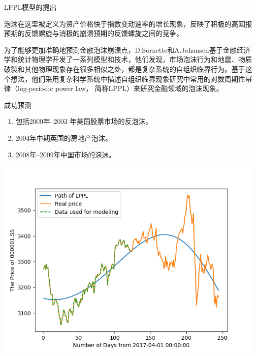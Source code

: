 \begin{frame}[t]{LPPL模型的提出}
    \begin{definition}[LPPL模型对金融泡沫的定义]
        泡沫在这里被定义为资产价格快于指数变动速率的增长现象，反映了积极的高回报预期的反馈螺旋与消极的崩溃预期的反馈螺旋之间的竞争。
    \end{definition}
    \vfill
    为了能够更加准确地预测金融泡沫崩溃点，D.Sornette和A.Johansen基于金融经济学和统计物理学开发了一系列模型和技术，他们发现，市场泡沫行为和地震、物质破裂和其他物理现象存在很多相似之处，都是复杂系统的自组织临界行为。基于这个想法，他们采用复杂科学系统中描述自组织临界现象研究中常用的对数周期性幂律（log-periodic power law， 简称LPPL）来研究金融领域的泡沫现象。
\end{frame}

\begin{frame}[t]{成功预测}
    \begin{enumerate}
        \item 包括2000年--2003 年美国股票市场的反泡沫。
        \item 2004年中期英国的房地产泡沫。
        \item 2008年--2009年中国市场的泡沫。
    \end{enumerate}
    \begin{center}
        \includegraphics[width=.6\textwidth]{figures/000001SS}
    \end{center}
\end{frame}
